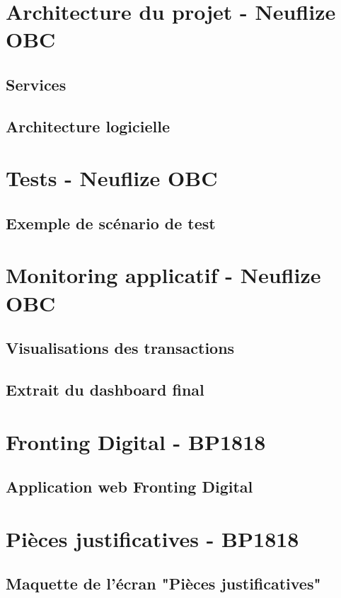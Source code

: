\documentclass[11pt,twoside]{scrreprt}
\begin{document}
\begin{appendices}
	\chapter{Architecture du projet - Neuflize OBC}
	
		\section{Services}
		\label{a1}
		
	
		\section{Architecture logicielle}
		\label{a2}
		
	
	\chapter{Tests - Neuflize OBC}
		\section{Exemple de scénario de test}
		\label{b1}
		

	\chapter{Monitoring applicatif - Neuflize OBC}
		\section{Visualisations des transactions}
		\label{c1}
		
		\section{Extrait du dashboard final}
		\label{c2}
		
		
	\chapter{Fronting Digital - BP1818}
		\section{Application web Fronting Digital}
		\label{d1}
				
		
	\chapter{Pièces justificatives - BP1818}
		\section{Maquette de l'écran "Pièces justificatives"}
		\label{e1}
		
\end{appendices}
\end{document}
